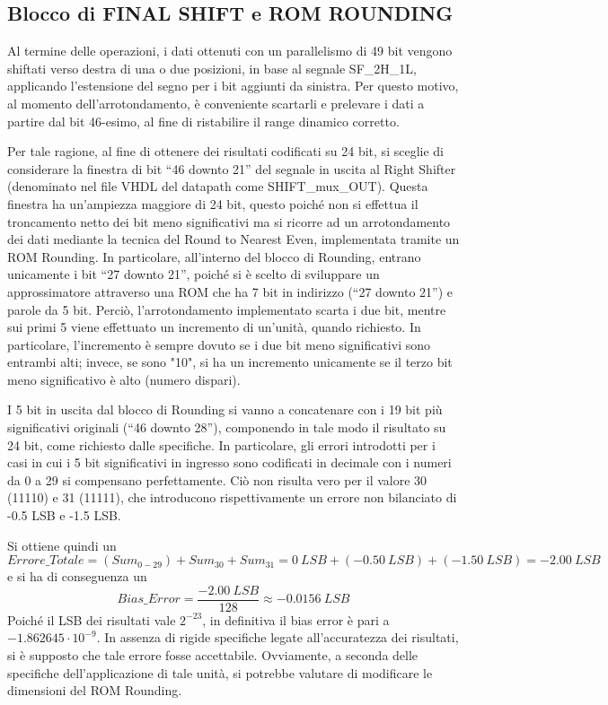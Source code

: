 \subsection{Blocco di FINAL SHIFT e ROM ROUNDING}
Al termine delle operazioni, i dati ottenuti con un parallelismo di 49 bit vengono shiftati verso destra di una o due posizioni, in base al segnale SF\_2H\_1L, applicando l’estensione del segno per i bit aggiunti da sinistra. Per questo motivo, al momento dell’arrotondamento, è conveniente scartarli e prelevare i dati a partire dal bit 46-esimo, al fine di ristabilire il range dinamico corretto. 

\noindent Per tale ragione, al fine di ottenere dei risultati codificati su 24 bit, si sceglie di considerare la finestra di bit “46 downto 21” del segnale in uscita al Right Shifter (denominato nel file VHDL del datapath come SHIFT\_mux\_OUT). Questa finestra ha un'ampiezza maggiore di 24 bit, questo poiché non si effettua il troncamento netto dei bit meno significativi ma si ricorre ad un arrotondamento dei dati mediante la tecnica del Round to Nearest Even, implementata tramite un ROM Rounding.
In particolare, all'interno del blocco di Rounding, entrano unicamente i bit “27 downto 21”, poiché si è scelto di sviluppare un approssimatore attraverso una ROM che ha 7 bit in indirizzo (“27 downto 21”) e parole da 5 bit. Perciò, l'arrotondamento implementato scarta i due bit, mentre sui primi 5 viene effettuato un incremento di un'unità, quando richiesto. In particolare, l'incremento è sempre dovuto se i due bit meno significativi sono entrambi alti; invece, se sono "10", si ha un incremento unicamente se il terzo bit meno significativo è alto (numero dispari).

\noindent I 5 bit in uscita dal blocco di Rounding si vanno a concatenare con i 19 bit più significativi originali (“46 downto 28”), componendo in tale modo il risultato su 24 bit, come richiesto dalle specifiche. In particolare, gli errori introdotti per i casi in cui i 5 bit significativi in ingresso  sono codificati in decimale con i numeri da 0 a 29 si compensano perfettamente. Ciò non risulta vero per il valore 30 (11110) e 31 (11111), che introducono rispettivamente un errore non bilanciato di -0.5 LSB e -1.5 LSB.

\noindent Si ottiene quindi un $$Errore\_{Totale} = (Sum_{0-29}) + Sum_{30} + Sum_{31} = 0\ LSB + (-0.50\ LSB) + (-1.50\ LSB) = -2.00\ LSB$$ e si ha di conseguenza un $$Bias\_Error = \frac{-2.00\ LSB}{128} \approx -0.0156\ LSB$$ 
Poiché il LSB dei risultati vale $2^{-23}$, in definitiva il bias error è pari a $-1.862645 \cdot 10^{-9}$. In assenza di rigide specifiche legate all'accuratezza dei risultati, si è supposto che tale errore fosse accettabile. Ovviamente, a seconda delle specifiche dell'applicazione di tale unità, si potrebbe valutare di modificare le dimensioni del ROM Rounding.

